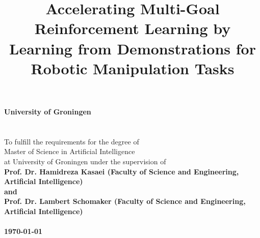 \documentclass[a4paper,12pt,twoside]{article}
\begin{document}
\pagestyle{body}


\title{
    \vspace{5cm}
        {\bf
        {\Huge Accelerating Multi-Goal  \\
        \vspace{2mm} Reinforcement Learning by  \\
        \vspace{2mm} Learning from Demonstrations for \\
        \vspace{4mm} Robotic Manipulation Tasks}} \\
        \vspace{10cm}{\LARGE Hari Vidharth}
}
\date{}

\maketitle
\thispagestyle{titlepage}


\newpage

\thispagestyle{titlepage}

\vspace*{4cm}

\begin{center}
    {\bf{\large University of Groningen}} \\

     \\

    \vspace{1cm}{\bf Master's Thesis} \\

    \vspace{1cm}To fulfill the requirements for the degree of \\
    Master of Science in Artificial Intelligence \\
    at University of Groningen under the supervision of \\

    \bf{Prof. Dr. Hamidreza Kasaei (Faculty of Science and Engineering, Artificial Intelligence)} \\
    and \\
    \bf{Prof. Dr. Lambert Schomaker (Faculty of Science and Engineering, Artificial Intelligence)} \\

     \\

    \vspace{7cm}\today
\end{center}
\end{document}
